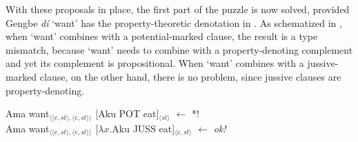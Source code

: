 \documentclass[output=paper,modfonts,nonflat]{langsci/langscibook}
\begin{document}
With these proposals in place, the first part of the puzzle is now solved, provided Gengbe \emph{d{\Z}\'i} `want' has the property-theoretic denotation in . As schematized in , when `want' combines with a potential-marked clause, the result is a type mismatch, because `want' needs to combine with a property-denoting complement and yet its complement is propositional. When `want' combines with a jussive-marked clause, on the other hand, there is no problem, since jussive clauses are property-denoting.


\ea \label{ex:grano:p1s:27}
    \begin{xlist}
    \ex Ama want$_{\langle\langle e,st\rangle,\langle e,st\rangle\rangle}$ [Aku POT eat]$_{\langle st\rangle}$  \hfill $\leftarrow$ *!\\
    \ex Ama want$_{\langle\langle e,st\rangle,\langle e,st\rangle\rangle}$ [$\lambda x$.Aku JUSS eat]$_{\langle e,st\rangle}$   \hfill $\leftarrow$ \emph{ok!} 
    \end{xlist}
\z
\end{document}
